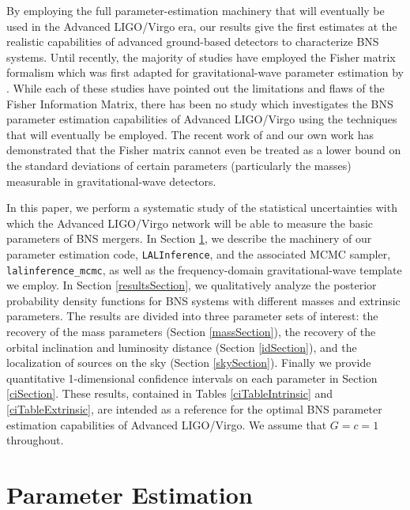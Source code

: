 \documentclass[11pt,a4paper]{emulateapj} 
\begin{document}
By employing the full parameter-estimation machinery that will
eventually be used in the Advanced LIGO/Virgo era, our results give
the first estimates at the realistic capabilities of advanced
ground-based detectors to characterize BNS systems.  Until recently,
the majority of studies have employed the Fisher matrix formalism
which was first adapted for gravitational-wave parameter estimation by
\citep{FinnDetection}.  While each of these studies
\citep{PoissonWill,CutlerFlanagan,ArunPE} have pointed out the
limitations and flaws of the Fisher Information Matrix, there has been
no study which investigates the BNS parameter estimation capabilities
of Advanced LIGO/Virgo using the techniques that will eventually be
employed.  The recent work of \cite{Vallisneri} and our own work
\citep{Inadequacies} has demonstrated that the Fisher matrix cannot
even be treated as a lower bound on the standard deviations of certain
parameters (particularly the masses) measurable in gravitational-wave
detectors.

In this paper, we perform a systematic study of the statistical
uncertainties with which the Advanced LIGO/Virgo network will be able
to measure the basic parameters of BNS mergers.  In Section
\ref{PEsection}, we describe the machinery of our parameter estimation
code, \texttt{LALInference}, and the associated MCMC sampler,
\texttt{lalinference\_mcmc}, as well as the frequency-domain
gravitational-wave template we employ.  In Section
\ref{resultsSection}, we qualitatively analyze the posterior
probability density functions for BNS systems with different masses
and extrinsic parameters.  The results are divided into three
parameter sets of interest: the recovery of the mass parameters
(Section \ref{massSection}), the recovery of the orbital inclination
and luminosity distance (Section \ref{idSection}), and the
localization of sources on the sky (Section \ref{skySection}).
Finally we provide quantitative 1-dimensional confidence intervals on
each parameter in Section \ref{ciSection}.  These results, contained
in Tables \ref{ciTableIntrinsic} and \ref{ciTableExtrinsic}, are
intended as a reference for the optimal BNS parameter estimation
capabilities of Advanced LIGO/Virgo.  We assume that $G=c=1$
throughout.


\section{Parameter Estimation}
\label{PEsection}
\end{document}
